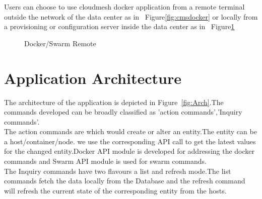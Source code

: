 \documentclass[9pt,twocolumn,twoside]{../../styles/osajnl}
\begin{document}
Users can choose to use cloudmesh docker application from a remote terminal outside the network of the data center as in ~Figure\ref{fig:cmsdocker} or locally from a provisioning or configuration server inside the data center as in ~Figure\ref{fig:cmsdocker-2}
\begin{figure}[h!]
\centering
{}
\caption{Docker/Swarm Remote }
\label{fig:cmsdocker-2}
\end{figure}



\section{Application Architecture}
The architecture of the application is depicted in Figure~\ref{fig:Arch}.The commands developed can be broadly classified as 'action commands','Inquiry commands'.\\
The action commands are which would create or alter an entity.The entity can be a host/container/node. we use the corresponding API call to get the latest values for the changed entity.Docker API module is developed for addressing the docker commands and Swarm API module is used for swarm commands.\\
The Inquiry commands have two flavours a list and refresh mode.The list commands fetch the data locally from the Database and the refresh command will refresh the current state of the corresponding entity from the hosts.
\end{document}
